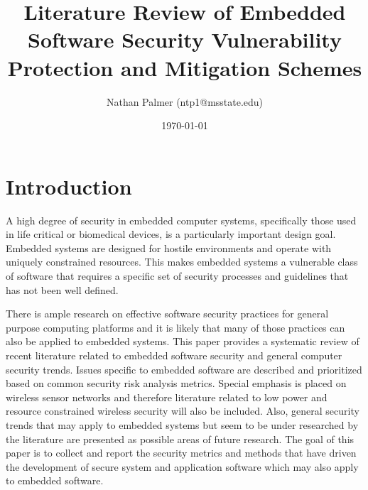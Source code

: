 \documentclass[final]{article}
\author{Nathan Palmer (ntp1@msstate.edu)}
\date{\today}
\title{Literature Review of Embedded Software Security Vulnerability Protection and Mitigation Schemes}
\begin{document}
\maketitle


\section{Introduction} 
A high degree of security in embedded computer systems, specifically those used in life critical or biomedical devices, is a particularly important design goal.  Embedded systems are designed for hostile environments and operate with uniquely constrained resources. This makes embedded systems a vulnerable class of software that requires a specific set of security processes and guidelines that has not been well defined.   

There is ample research on effective software security practices for general purpose computing platforms and it is likely that many of those practices can also be applied to embedded systems. This paper provides a systematic review of recent literature related to embedded software security and general computer security trends. Issues specific to embedded software are described and prioritized based on common security risk analysis metrics.  Special emphasis is placed on wireless sensor networks and therefore literature related to low power and resource constrained wireless security will also be included.  Also, general security trends that may apply to embedded systems but seem to be under researched by the literature are presented as possible areas of future research.  The goal of this paper is to collect and report the security metrics and methods that have driven the development of secure system and application software which may also apply to embedded software.
\end{document}
